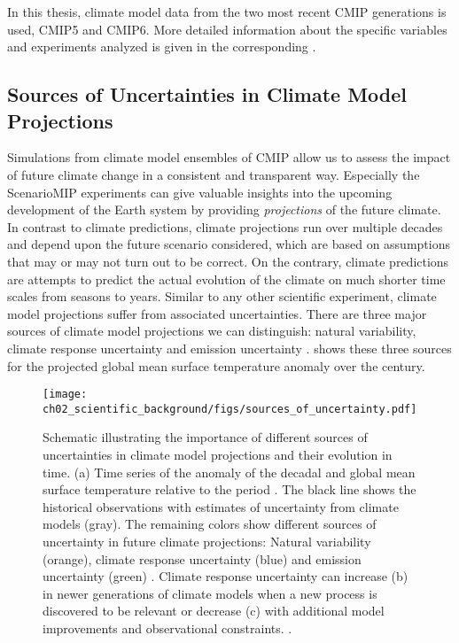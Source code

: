 In this thesis, climate model data from the two most recent \ac{CMIP}
generations is used, \acs{CMIP}5 and \acs{CMIP}6. More detailed information
about the specific variables and experiments analyzed is given in the
corresponding .


\subsection{Sources of Uncertainties in Climate Model Projections}
\label{subsec:02:source_of_uncertainties}

Simulations from climate model ensembles of \ac{CMIP} allow us to assess the
impact of future climate change in a consistent and transparent way. Especially
the \ac{ScenarioMIP} experiments can give valuable insights into the upcoming
development of the Earth system by providing \emph{projections} of the future
climate. In contrast to climate predictions, climate projections run over
multiple decades and depend upon the future scenario considered, which are
based on assumptions that may or may not turn out to be correct. On the
contrary, climate predictions are attempts to predict the actual evolution of
the climate on much shorter time scales from seasons to years. Similar to any
other scientific experiment, climate model projections suffer from associated
uncertainties. There are three major sources of climate model projections we
can distinguish: natural variability, climate response uncertainty and emission
uncertainty \autocite{Hawkins2009, Hawkins2010}.
 shows these three sources for the
projected global mean surface temperature anomaly over the  century.

\begin{figure}[t]
  \centering
  \texttt{[image: 
    ch02\_scientific\_background/figs/sources\_of\_uncertainty.pdf]}
  \caption{Schematic illustrating the importance of different sources of
    uncertainties in climate model projections and their evolution in time. (a)
    Time series of the anomaly of the decadal and global mean surface
    temperature relative to the period . The black line
    shows the historical observations with estimates of uncertainty from
    climate models (gray). The remaining colors show different sources of
    uncertainty in future climate projections: Natural variability (orange),
    climate response uncertainty (blue) and emission uncertainty (green)
    \autocite{Hawkins2009, Hawkins2010}. Climate response uncertainty can
    increase (b) in newer generations of climate models when a new process is
    discovered to be relevant or decrease (c) with additional model
    improvements and observational constraints.
    .}
  \label{fig:02:sources_of_uncertainty}
\end{figure}


